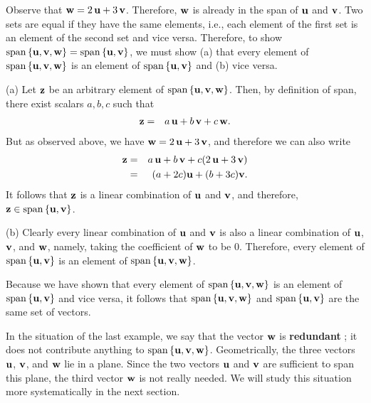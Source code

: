 \begin{solution}
  Observe that $\mbox{\bf w} = 2\,\mbox{\bf u}+3\,\mbox{\bf v}$. Therefore,
  $\mbox{\bf w}$ is already in the span of $\mbox{\bf u}$ and $\mbox{\bf v}$.  Two
  sets are equal if they have the same elements, i.e., each element of
  the first set is an element of the second set and vice
  versa. Therefore, to show
  $\sspan\set{\vect{u},\vect{v},\vect{w}} =
  \sspan\set{\vect{u},\vect{v}}$, we must show (a) that every element
  of $\sspan\set{\vect{u},\vect{v},\vect{w}}$ is an element of
  $\sspan\set{\vect{u},\vect{v}}$ and (b) vice versa.

  (a) Let $\mbox{\bf z}$ be an arbitrary element of
  $\sspan\set{\vect{u},\vect{v},\vect{w}}$. Then, by definition of
  span, there exist scalars $a,b,c$ such that
  \begin{eqnarray*}
    \mbox{\bf z} &=& a\,\mbox{\bf u} + b\,\mbox{\bf v} + c\,\mbox{\bf w}.
  \end{eqnarray*}
  But as observed above, we have $\mbox{\bf w} = 2\,\mbox{\bf u}+3\,\mbox{\bf v}$,
  and therefore we can also write
  \begin{eqnarray*}
    \mbox{\bf z}
    &=& a\,\mbox{\bf u} + b\,\mbox{\bf v} + c(2\,\mbox{\bf u}+3\,\mbox{\bf v})\\
    &=& (a+2c)\mbox{\bf u} + (b+3c)\mbox{\bf v}.
  \end{eqnarray*}
  It follows that $\mbox{\bf z}$ is a linear combination of $\mbox{\bf u}$ and
  $\mbox{\bf v}$, and therefore, $\vect{z}\in \sspan\set{\vect{u},\vect{v}}$. 

  (b) Clearly every linear combination of $\mbox{\bf u}$ and $\mbox{\bf v}$ is
  also a linear combination of $\mbox{\bf u}$, $\mbox{\bf v}$, and $\mbox{\bf w}$,
  namely, taking the coefficient of $\mbox{\bf w}$ to be $0$. Therefore,
  every element of $\sspan\set{\vect{u},\vect{v}}$ is an element of
  $\sspan\set{\vect{u},\vect{v},\vect{w}}$.

  Because we have shown that every element of
  $\sspan\set{\vect{u},\vect{v},\vect{w}}$ is an element of
  $\sspan\set{\vect{u},\vect{v}}$ and vice versa, it follows that
  $\sspan\set{\vect{u},\vect{v},\vect{w}}$ and
  $\sspan\set{\vect{u},\vect{v}}$ are the same set of vectors.
\end{solution}

In the situation of the last example, we say that the vector
$\mbox{\bf w}$ is \textbf{redundant}%
; it does not
contribute anything to
$\sspan\set{\vect{u},\vect{v},\vect{w}}$. Geometrically, the three
vectors $\mbox{\bf u}$, $\mbox{\bf v}$, and $\mbox{\bf w}$ lie in a plane. Since
the two vectors $\mbox{\bf u}$ and $\mbox{\bf v}$ are sufficient to span this
plane, the third vector $\mbox{\bf w}$ is not really needed. We will study
this situation more systematically in the next section. 


